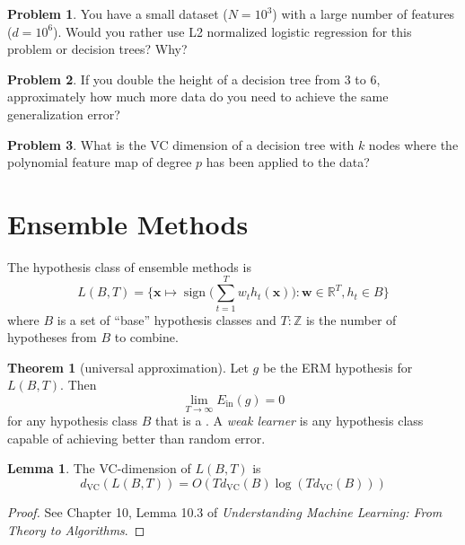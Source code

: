 \documentclass[10pt]{exam}
\theoremstyle{definition}
\newtheorem{problem}{Problem}
\newtheorem{lemma}{Lemma}
\newtheorem{theorem}{Theorem}
\newcommand{\R}{\mathbb R}
\DeclareMathOperator{\sign}{sign}
\newcommand{\Ein}{E_{\text{in}}}
\newcommand{\w}{\mathbf w}
\newcommand{\x}{\mathbf x}
\newcommand{\dvc}{{d_{\text{VC}}}}
\begin{document}
\newpage
\begin{problem}
    You have a small dataset ($N=10^3$) with a large number of features ($d=10^6$).
    Would you rather use L2 normalized logistic regression for this problem or decision trees?
    Why?
\end{problem}

\vspace{5in}
\begin{problem}
    If you double the height of a decision tree from 3 to 6, approximately how much more data do you need to achieve the same generalization error?
\end{problem}

\newpage
\begin{problem}
    What is the VC dimension of a decision tree with $k$ nodes where the polynomial feature map of degree $p$ has been applied to the data?
\end{problem}

\newpage
\section*{Ensemble Methods}

The hypothesis class of ensemble methods is
\begin{equation}
    L(B,T) = \bigg\{ \x \mapsto \sign \bigg(\sum_{t=1}^T w_t h_t(\x)\bigg) : \w \in \R^T, h_t \in B \bigg\}
\end{equation}
where $B$ is a set of ``base'' hypothesis classes and $T:\mathbb Z$ is the number of hypotheses from $B$ to combine.

\begin{theorem}[universal approximation]
    Let $g$ be the ERM hypothesis for $L(B,T)$.
    Then
    \begin{equation}
        \lim_{T\to\infty} \Ein(g) = 0
    \end{equation}
    for any hypothesis class $B$ that is a .
    A \emph{weak learner} is any hypothesis class capable of achieving better than random error.
\end{theorem}

\begin{lemma}
    The VC-dimension of $L(B,T)$ is
    \begin{equation}
        \dvc(L(B,T)) = O(T \dvc(B) \log(T \dvc(B)))
    \end{equation}
\end{lemma}
\begin{proof}
See Chapter 10, Lemma 10.3 of \emph{Understanding Machine Learning: From Theory to Algorithms}.
\end{proof}
\end{document}

